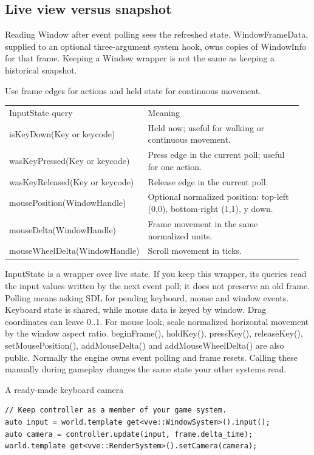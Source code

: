 \documentclass[11pt,a4paper]{article}
\begin{document}
\subsection*{Live view versus snapshot}
Reading Window after event polling sees the refreshed state. WindowFrameData, supplied to an optional three-argument system hook, owns copies of WindowInfo for that frame. Keeping a Window wrapper is not the same as keeping a historical snapshot.

\label{core-13}
Use frame edges for actions and held state for continuous movement.

{\small
\begin{longtable}{@{}p{0.42\linewidth}p{0.54\linewidth}@{}}
InputState query & Meaning \\
isKeyDown(Key or keycode) & Held now; useful for walking or continuous movement. \\
wasKeyPressed(Key or keycode) & Press edge in the current poll; useful for one action. \\
wasKeyReleased(Key or keycode) & Release edge in the current poll. \\
mousePosition(WindowHandle) & Optional normalized position: top-left (0,0), bottom-right (1,1), y down. \\
mouseDelta(WindowHandle) & Frame movement in the same normalized units. \\
mouseWheelDelta(WindowHandle) & Scroll movement in ticks. \\
\end{longtable}
}

InputState is a wrapper over live state. If you keep this wrapper, its queries read the input values written by the next event poll; it does not preserve an old frame. Polling means asking SDL for pending keyboard, mouse and window events. Keyboard state is shared, while mouse data is keyed by window. Drag coordinates can leave 0..1. For mouse look, scale normalized horizontal movement by the window aspect ratio. beginFrame(), holdKey(), pressKey(), releaseKey(), setMousePosition(), addMouseDelta() and addMouseWheelDelta() are also public. Normally the engine owns event polling and frame resets. Calling these manually during gameplay changes the same state your other systems read.

A ready-made keyboard camera

\begin{lstlisting}[language={}]
// Keep controller as a member of your game system.
auto input = world.template get<vve::WindowSystem>().input();
auto camera = controller.update(input, frame.delta_time);
world.template get<vve::RenderSystem>().setCamera(camera);
\end{lstlisting}
\end{document}

